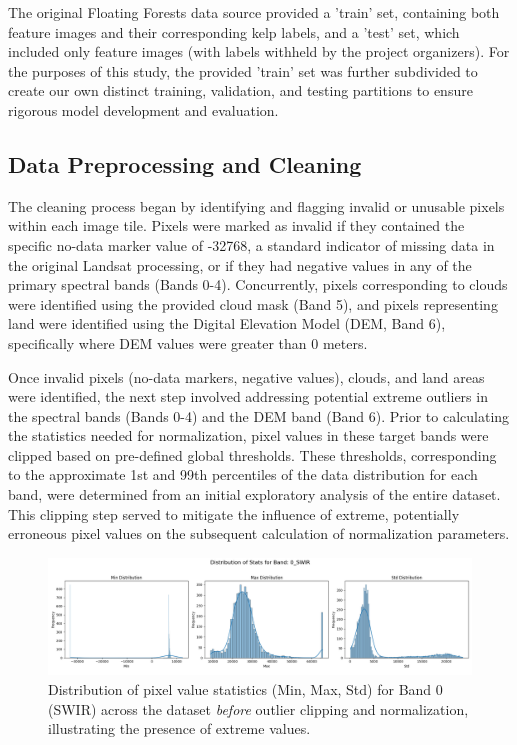 \documentclass{article}
\begin{document}
The original Floating Forests data source provided a 'train' set, containing both feature images and their corresponding kelp labels, and a 'test' set, which included only feature images (with labels withheld by the project organizers). For the purposes of this study, the provided 'train' set was further subdivided to create our own distinct training, validation, and testing partitions to ensure rigorous model development and evaluation.

\subsection{Data Preprocessing and Cleaning}

The cleaning process began by identifying and flagging invalid or unusable pixels within each image tile. Pixels were marked as invalid if they contained the specific no-data marker value of -32768, a standard indicator of missing data in the original Landsat processing, or if they had negative values in any of the primary spectral bands (Bands 0-4). Concurrently, pixels corresponding to clouds were identified using the provided cloud mask (Band 5), and pixels representing land were identified using the Digital Elevation Model (DEM, Band 6), specifically where DEM values were greater than 0 meters.

Once invalid pixels (no-data markers, negative values), clouds, and land areas were identified, the next step involved addressing potential extreme outliers in the spectral bands (Bands 0-4) and the DEM band (Band 6). Prior to calculating the statistics needed for normalization, pixel values in these target bands were clipped based on pre-defined global thresholds. These thresholds, corresponding to the approximate 1st and 99th percentiles of the data distribution for each band, were determined from an initial exploratory analysis of the entire dataset. This clipping step served to mitigate the influence of extreme, potentially erroneous pixel values on the subsequent calculation of normalization parameters. 

\begin{figure}[htbp]
    \centering
    \includegraphics[width=\textwidth]{distribution_0_SWIR_before.png} %
    \caption{Distribution of pixel value statistics (Min, Max, Std) for Band 0 (SWIR) across the dataset \textit{before} outlier clipping and normalization, illustrating the presence of extreme values.}
    \label{fig:stats_before}
\end{figure}
\end{document}
